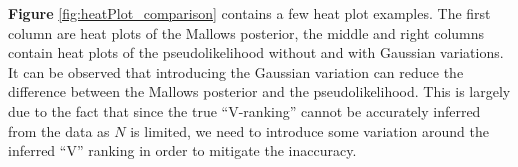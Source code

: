 \documentclass[11pt, oneside]{article}   	%
\begin{document}
\textbf{Figure} \ref{fig:heatPlot_comparison} contains a few heat plot examples. The first column are heat plots of the Mallows posterior, the middle and right columns contain heat plots of the pseudolikelihood without and with Gaussian variations. It can be observed that introducing the Gaussian variation can reduce the difference between the Mallows posterior and the pseudolikelihood. This is largely due to the fact that since the true ``V-ranking'' cannot be accurately inferred from the data as $N$ is limited, we need to introduce some variation around the inferred ``V'' ranking in order to mitigate the inaccuracy.

\begin{figure}[h!]
\end{figure}
\end{document}
